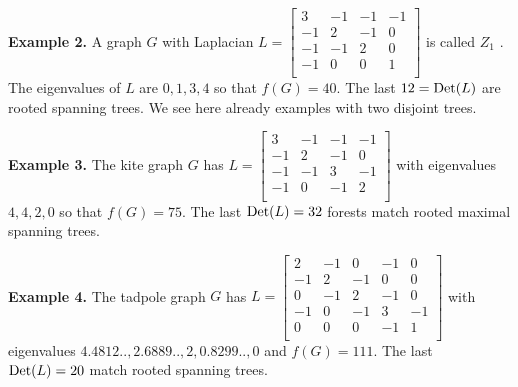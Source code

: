 \documentclass[12pt]{amsart}
\theoremstyle{definition}
\begin{document}
{\bf Example 2.}
A graph $G$ with Laplacian
$L=\left[
\begin{array}{cccc}
 3 & -1 & -1 & -1 \\
 -1 & 2 & -1 & 0 \\
 -1 & -1 & 2 & 0 \\
 -1 & 0 & 0 & 1 \\
\end{array} \right]$ is called $Z_1$ \cite{HHM}. 
The eigenvalues of $L$ are $0,1,3,4$ so that $f(G) =40$. 
The last $12 = {\rm{Det}}(L)$ are rooted spanning trees. 
We see here already examples with two disjoint trees. 

\begin{figure}
\end{figure}

{\bf Example 3.}
The kite graph $G$ has $L=\left[
                 \begin{array}{cccc}
                  3 & -1 & -1 & -1 \\
                  -1 & 2 & -1 & 0 \\
                  -1 & -1 & 3 & -1 \\
                  -1 & 0 & -1 & 2 \\
                 \end{array}
                 \right]$ with eigenvalues $4,4,2,0$
so that $f(G) =75$. The last ${\rm{Det}}(L)=32$ forests match rooted maximal spanning trees.

\begin{figure}[H]
\end{figure}
\begin{figure}
\end{figure}

{\bf Example 4.}
The tadpole graph $G$ has $L= \left[
                 \begin{array}{ccccc}
                  2 & -1 & 0 & -1 & 0 \\
                  -1 & 2 & -1 & 0 & 0 \\
                  0 & -1 & 2 & -1 & 0 \\
                  -1 & 0 & -1 & 3 & -1 \\
                  0 & 0 & 0 & -1 & 1 \\
                 \end{array}
                 \right]$ with eigenvalues $4.4812.., 2.6889.., 2, 0.8299..,0$
and $f(G) =111$. The last ${\rm{Det}}(L)=20$ match rooted spanning trees.
\end{document}
